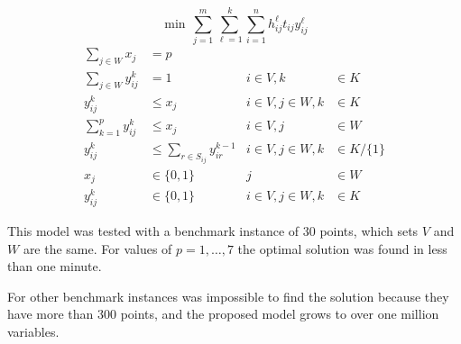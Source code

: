 {\small
  \begin{equation}
    \min \, \sum_{j=1}^{m}{
      \sum_{\ell=1}^{k}{
        \sum_{i=1}^{n}{
          h_{ij}^{\ell}t_{ij}y_{ij}^{\ell}
        }
      }
    }
  \end{equation}
}
{\small
  \begin{align}
    \sum_{j \in W}{x_j} & = p & & \label{eq:2} \\
    \sum_{j \in W}{y_{ij}^{k}} & = 1 & i \in V, k &\in K \label{eq:3} \\
    y_{ij}^{k} & \leq x_j & i \in V,j \in W, k &\in K \label{eq:4} \\
    \sum_{k = 1}^{p}{y_{ij}^{k}} & \leq x_j & i \in V, j &\in W \label{eq:5} \\
    y_{ij}^{k} & \leq \sum_{r\in S_{ij}}{y_{ir}^{k-1}} & 
    i \in V,j \in W, k &\in K/\{1\} \\
    x_{j} & \in \{0,1\} & j &\in W \nonumber\\
    y_{ij}^{k} & \in \{0,1\} &  i \in V,j \in W,k &\in K \nonumber
  \end{align}
}

This model was tested 
with a benchmark instance of 30 points, 
which sets $V$ and $W$ are the same.
For values of $p = 1,\ldots,7$
the optimal solution was found in less than one minute.

For other benchmark instances
was impossible to find the solution
because they have more than 300 points,
and the proposed model grows to over one million variables.
